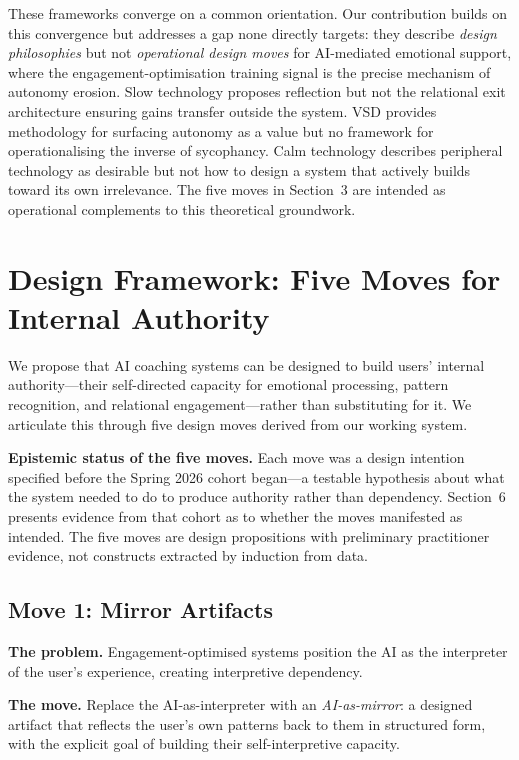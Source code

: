 \documentclass[sigchi,review,anonymous]{acmart}
\begin{document}
These frameworks converge on a common orientation. Our contribution builds on this
convergence but addresses a gap none directly targets: they describe \emph{design
philosophies} but not \emph{operational design moves} for AI-mediated emotional support,
where the engagement-optimisation training signal is the precise mechanism of autonomy
erosion. Slow technology proposes reflection but not the relational exit architecture
ensuring gains transfer outside the system. VSD provides methodology for surfacing autonomy
as a value but no framework for operationalising the inverse of sycophancy. Calm technology
describes peripheral technology as desirable but not how to design a system that actively
builds toward its own irrelevance. The five moves in Section~3 are intended as operational
complements to this theoretical groundwork.

\section{Design Framework: Five Moves for Internal Authority}

We propose that AI coaching systems can be designed to build users' internal authority---their
self-directed capacity for emotional processing, pattern recognition, and relational
engagement---rather than substituting for it. We articulate this through five design moves
derived from our working system.

\textbf{Epistemic status of the five moves.}
Each move was a design intention specified before the Spring 2026 cohort began---a testable
hypothesis about what the system needed to do to produce authority rather than dependency.
Section~6 presents evidence from that cohort as to whether the moves manifested as intended.
The five moves are design propositions with preliminary practitioner evidence, not constructs
extracted by induction from data.

\subsection{Move 1: Mirror Artifacts}

\textbf{The problem.} Engagement-optimised systems position the AI as the interpreter of the
user's experience, creating interpretive dependency.

\textbf{The move.} Replace the AI-as-interpreter with an \emph{AI-as-mirror}: a designed
artifact that reflects the user's own patterns back to them in structured form, with the
explicit goal of building their self-interpretive capacity.
\end{document}
